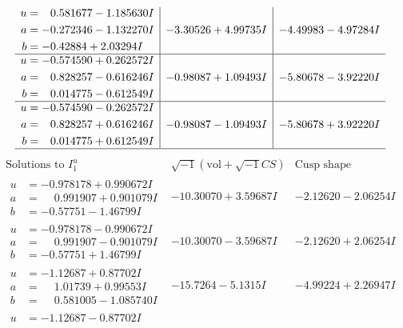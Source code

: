 \documentclass[1p]{elsarticle_modified}
\theoremstyle{definition}
\newcommand{\I}{\sqrt{-1}}
\begin{document}
$$\begin{array}{c|c|c}
\begin{aligned}
u &= \phantom{-}0.581677 - 1.185630 I \\
a &= -0.272346 - 1.132270 I \\
b &= -0.42884 + 2.03294 I\end{aligned}
 & -3.30526 + 4.99735 I & -4.49983 - 4.97284 I \\ \hline\begin{aligned}
u &= -0.574590 + 0.262572 I \\
a &= \phantom{-}0.828257 - 0.616246 I \\
b &= \phantom{-}0.014775 - 0.612549 I\end{aligned}
 & -0.98087 + 1.09493 I & -5.80678 - 3.92220 I \\ \hline\begin{aligned}
u &= -0.574590 - 0.262572 I \\
a &= \phantom{-}0.828257 + 0.616246 I \\
b &= \phantom{-}0.014775 + 0.612549 I\end{aligned}
 & -0.98087 - 1.09493 I & -5.80678 + 3.92220 I\\
 \hline 
 \end{array}$$\newpage$$\begin{array}{c|c|c}  
\text{Solutions to }I^u_{1}& \I (\text{vol} + \sqrt{-1}CS) & \text{Cusp shape}\\
 \hline 
\begin{aligned}
u &= -0.978178 + 0.990672 I \\
a &= \phantom{-}0.991907 + 0.901079 I \\
b &= -0.57751 - 1.46799 I\end{aligned}
 & -10.30070 + 3.59687 I & -2.12620 - 2.06254 I \\ \hline\begin{aligned}
u &= -0.978178 - 0.990672 I \\
a &= \phantom{-}0.991907 - 0.901079 I \\
b &= -0.57751 + 1.46799 I\end{aligned}
 & -10.30070 - 3.59687 I & -2.12620 + 2.06254 I \\ \hline\begin{aligned}
u &= -1.12687 + 0.87702 I \\
a &= \phantom{-}1.01739 + 0.99553 I \\
b &= \phantom{-}0.581005 - 1.085740 I\end{aligned}
 & -15.7264 - 5.1315 I & -4.99224 + 2.26947 I \\ \hline\begin{aligned}
u &= -1.12687 - 0.87702 I \\

\end{aligned}
\end{array}$$
\end{document}
